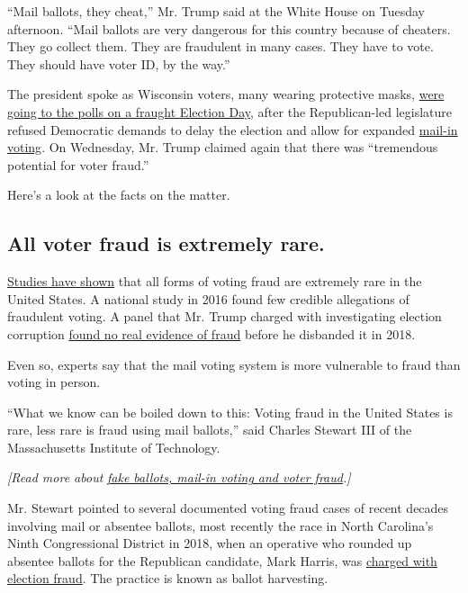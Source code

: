 ``Mail ballots, they cheat,'' Mr. Trump said at the White House on
Tuesday afternoon. ``Mail ballots are very dangerous for this country
because of cheaters. They go collect them. They are fraudulent in many
cases. They have to vote. They should have voter ID, by the way.''

The president spoke as Wisconsin voters, many wearing protective masks,
\href{https://www.nytimes3xbfgragh.onion/2020/04/07/us/politics/wisconsin-election-coronavirus.html}{were
going to the polls on a fraught Election Day}, after the Republican-led
legislature refused Democratic demands to delay the election and allow
for expanded
\href{https://www.nytimes3xbfgragh.onion/2020/04/10/us/politics/vote-by-mail.html}{mail-in
voting}. On Wednesday, Mr. Trump claimed again that there was
``tremendous potential for voter fraud.''

Here's a look at the facts on the matter.

\hypertarget{all-voter-fraud-is-extremely-rare}{%
\subsection{All voter fraud is extremely
rare.}\label{all-voter-fraud-is-extremely-rare}}

\href{https://www.nytimes3xbfgragh.onion/2016/12/18/us/voter-fraud.html}{Studies
have shown} that all forms of voting fraud are extremely rare in the
United States. A national study in 2016 found few credible allegations
of fraudulent voting. A panel that Mr. Trump charged with investigating
election corruption
\href{https://www.nytimes3xbfgragh.onion/2018/01/03/us/politics/trump-voter-fraud-commission.html}{found
no real evidence of fraud} before he disbanded it in 2018.

Even so, experts say that the mail voting system is more vulnerable to
fraud than voting in person.

``What we know can be boiled down to this: Voting fraud in the United
States is rare, less rare is fraud using mail ballots,'' said Charles
Stewart III of the Massachusetts Institute of Technology.

\emph{{[}Read more about}
\href{https://www.nytimes3xbfgragh.onion/article/mail-in-vote-fraud-ballot.html}{\emph{fake
ballots, mail-in voting and voter fraud}}\emph{.{]}}

Mr. Stewart pointed to several documented voting fraud cases of recent
decades involving mail or absentee ballots, most recently the race in
North Carolina's Ninth Congressional District in 2018, when an operative
who rounded up absentee ballots for the Republican candidate, Mark
Harris, was
\href{https://www.nytimes3xbfgragh.onion/2019/07/30/us/mccrae-dowless-indictment.html}{charged
with election fraud}. The practice is known as ballot harvesting.

